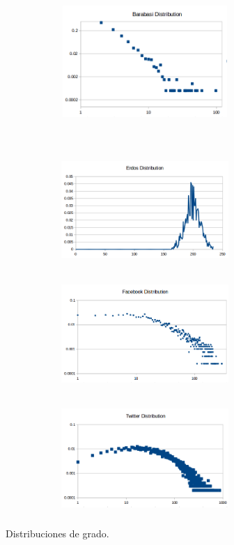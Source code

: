 \documentclass[spanish]{assignment}
\begin{document}
	\begin{figure}[ht!]
		\begin{subfigure}[t!]{\textwidth}
			\begin{subfigure}[t!]{\textwidth}
				\centering
				\includegraphics[width=180pt, height=120pt]{img/barabasi_dl.png}
			\end{subfigure}\\
			\begin{subfigure}[t!]{\textwidth}
				\centering
				\includegraphics[width=180pt, height=120pt]{img/erdos_d.png}
			\end{subfigure}
		\end{subfigure}
		\begin{subfigure}[t!]{\textwidth}
			\begin{subfigure}[t!]{\textwidth}
				\centering
				\includegraphics[width=180pt, height=120pt]{img/facebook_dl.png}
			\end{subfigure}
			\begin{subfigure}[t!]{\textwidth}
				\centering
				\includegraphics[width=180pt, height=120pt]{img/twitter_d.png}
			\end{subfigure}
		\end{subfigure}
		\caption{%
			Distribuciones de grado.
		}%
		\label{distribuciones}
	\end{figure}
	
\end{document}
